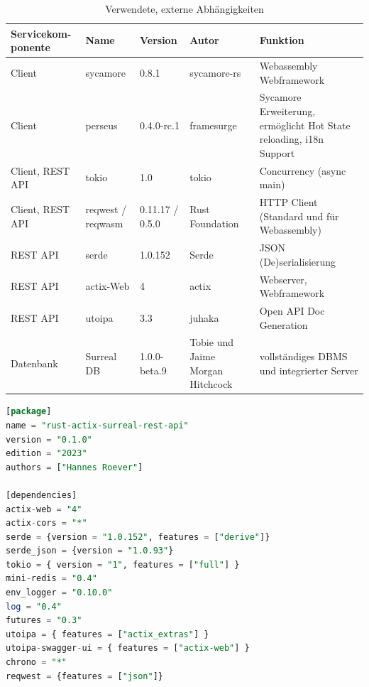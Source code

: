 \documentclass[notitlepage, hidelinks]{article}
\begin{document}
\begin{table}[H]
\begin{center}
\begin{tabular}{| L{2.5cm} | L{2cm} | L{2cm} | L{2.9cm} | L{2.9cm} | }
\hline
Servicekom- ponente & Name & Version & Autor & Funktion \\ \hline
Client & sycamore & 0.8.1 & sycamore-rs & Webassembly Webframework  \\ \hline
Client & perseus & 0.4.0-rc.1 & framesurge &  Sycamore Erweiterung, ermöglicht Hot State reloading, i18n Support \\ \hline
Client, REST API & tokio & 1.0 & tokio & Concurrency (async main)  \\ \hline
Client, REST API & reqwest / reqwasm & 0.11.17 / 0.5.0 & Rust Foundation & HTTP Client (Standard und für Webassembly) \\ \hline
REST API & serde & 1.0.152 & Serde &  JSON (De)serialisierung  \\ \hline
REST API & actix-Web & 4 & actix & Webserver, Webframework  \\ \hline
REST API & utoipa & 3.3 & juhaka & Open API Doc Generation  \\ \hline
Datenbank & Surreal DB & 1.0.0-beta.9 & Tobie und Jaime Morgan Hitchcock & vollständiges DBMS und integrierter Server \\ \hline 
\end{tabular}
\caption{Verwendete, externe Abhängigkeiten}
\label{dependencies}
\end{center}
\end{table}

\begin{lstlisting}[language=SQL,frame=single,caption=cargo.toml Datei zur Organisation der Abhängigkeiten in Rust\, hier für die REST API,label=toml]
[package]
name = "rust-actix-surreal-rest-api"
version = "0.1.0"
edition = "2023"
authors = ["Hannes Roever"]

[dependencies]
actix-web = "4"
actix-cors = "*"
serde = {version = "1.0.152", features = ["derive"]}
serde_json = {version = "1.0.93"}
tokio = { version = "1", features = ["full"] }
mini-redis = "0.4"
env_logger = "0.10.0"
log = "0.4"
futures = "0.3"
utoipa = { features = ["actix_extras"] }
utoipa-swagger-ui = { features = ["actix-web"] }
chrono = "*"
reqwest = {features = ["json"]}
\end{lstlisting}
\end{document}
